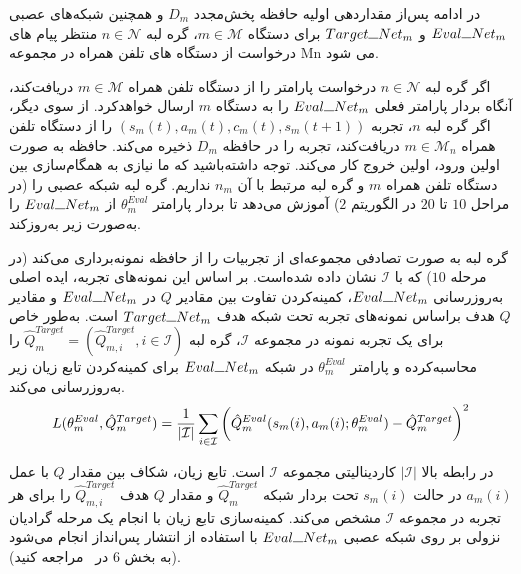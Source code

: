 

در ادامه پس‌از مقداردهی اولیه حافظه پخش‌مجدد $D_m$ و همچنین شبکه‌های عصبی $Eval\rule{0.25cm}{0.15mm}Net_m$ و $Target\rule{0.25cm}{0.15mm}Net_m$ برای دستگاه $m \in \mathcal{M}$، گره لبه $n \in \mathcal{N}$ منتظر پیام های درخواست از دستگاه های تلفن همراه در مجموعه Mn می شود.

اگر گره لبه $n \in \mathcal{N}$ درخواست پارامتر را از دستگاه تلفن همراه $m \in \mathcal{M}$ دریافت‌کند، آنگاه بردار پارامتر فعلی $Eval\rule{0.25cm}{0.15mm}Net_m$ را به دستگاه $m$ ارسال خواهدکرد. از سوی دیگر، اگر گره لبه $n$، تجربه $(s_m(t), a_m(t), c_m(t), s_m(t+1))$ را از دستگاه تلفن همراه $m \in \mathcal{M}_n$ دریافت‌کند، تجربه را در حافظه $D_m$ ذخیره می‌کند. حافظه به صورت اولین ورود، اولین خروج کار می‌کند. توجه داشته‌باشید که ما نیازی به همگام‌سازی بین دستگاه تلفن همراه $m$ و گره لبه مرتبط با آن $n_m$ نداریم. گره لبه شبکه عصبی را (در مراحل $10$ تا $20$‌ در الگوریتم $2$) آموزش می‌دهد تا بردار پارامتر $\theta_m^{Eval}$ از $Eval\rule{0.25cm}{0.15mm}Net_m$ را به‌صورت زیر به‌روزکند. 


گره لبه به صورت تصادفی مجموعه‌ای از تجربیات را از حافظه نمونه‌برداری می‌کند (در مرحله $10$) که با $\mathcal{I}$ نشان داده شده‌است. بر اساس این نمونه‌های تجربه، ایده اصلی به‌روزرسانی $Eval\rule{0.25cm}{0.15mm}Net_m$، کمینه‌کردن تفاوت بین مقادیر $Q$ در $Eval\rule{0.25cm}{0.15mm}Net_m$ و مقادیر$Q$ هدف براساس نمونه‌های تجربه تحت شبکه هدف $Target\rule{0.25cm}{0.15mm}Net_m$ ‌است. به‌طور خاص برای یک تجربه نمونه در مجموعه $\mathcal{I}$، گره لبه $\hat{Q}_m^{Target} = (\hat{Q}_{m,i}^{Target} , i \in \mathcal{I})$ را محاسبه‌کرده و پارامتر $\theta_m^{Eval}$ در شبکه $Eval\rule{0.25cm}{0.15mm}Net_m$ برای کمینه‌کردن تابع زیان زیر به‌روزرسانی می‌کند.
\begin{alignat}{2}
	L(\theta_m^{Eval},\hat{Q}_m^{Target}) = {1 \over |\mathcal{I}| } \sum\limits_{i \in \mathcal{I}} \bigg(\hat{Q}_m^{Eval}(s_m(i) , a_m(i); \theta_m^{Eval} ) -   \hat{Q}_m^{Target}  \bigg)^2
	\label{23}  
\end{alignat}  





در رابطه بالا $|\mathcal{I}|$ کاردینالیتی مجموعه $\mathcal{I}$ است. تابع زیان، شکاف بین مقدار $Q$ با عمل $a_m(i)$ در حالت $s_m(i)$ تحت بردار شبکه $\hat{Q}_m^{Target}$ و مقدار $Q$ هدف $\hat{Q}_{m,i}^{Target}$ را برای هر تجربه در مجموعه $\mathcal{I}$ مشخص می‌کند. کمینه‌سازی تابع زیان با انجام یک مرحله گرادیان نزولی بر روی شبکه عصبی $Eval\rule{0.25cm}{0.15mm}Net_m$ با استفاده از انتشار پس‌انداز انجام می‌شود (به بخش 6 در~\cite{gers2000learning} مراجعه کنید).

